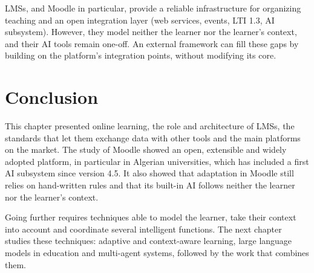 \begin{summarybox}
LMSs, and Moodle in particular, provide a reliable infrastructure for
organizing teaching and an open integration layer (web services, events,
LTI 1.3, AI subsystem). However, they model neither the learner nor the
learner's context, and their AI tools remain one-off. An external
framework can fill these gaps by building on the platform's integration
points, without modifying its core.
\end{summarybox}

\section*{Conclusion}

This chapter presented online learning, the role and architecture of
LMSs, the standards that let them exchange data with other tools and the
main platforms on the market. The study of Moodle showed an open,
extensible and widely adopted platform, in particular in Algerian
universities, which has included a first AI subsystem since version 4.5.
It also showed that adaptation in Moodle still relies on hand-written
rules and that its built-in AI follows neither the learner nor the
learner's context.

Going further requires techniques able to model the learner, take their
context into account and coordinate several intelligent functions. The
next chapter studies these techniques: adaptive and context-aware
learning, large language models in education and multi-agent systems,
followed by the work that combines them.
